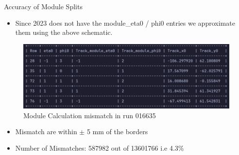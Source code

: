 \begin{frame}{Accuracy of Module Splits}
    \begin{itemize}
        \item Since 2023 does not have the module\_eta0 / phi0 entries we approximate them using the above schematic.
    \end{itemize}
    \begin{figure}
        \centering
        \includegraphics[width=1.0\linewidth]{./assets/ModuleMismatch.png}
        \caption{Module Calculation mismatch in run 016635}
    \end{figure}   
    \begin{itemize}
        \item Mismatch are within $\pm$ 5 mm of the borders
        \item Number of Mismatches:  587982  out of  13601766 i.e 4.3\%
    \end{itemize}
\end{frame}


